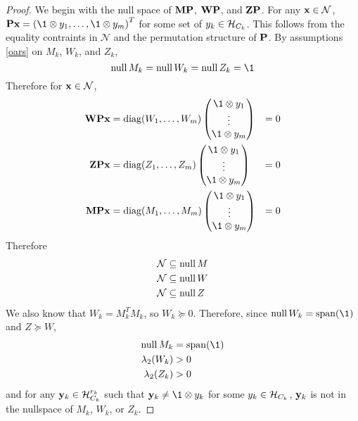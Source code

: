 \begin{proof}
We begin with the null space of $\mathbf{M}\mathbf{P}$, $\mathbf{W}\mathbf{P}$, and $\mathbf{Z}\mathbf{P}$.
For any $\mathbf{x} \in \mathcal{N}$, $\v{P}\v{x} = \left(\1 \otimes y_1, \dots, \1 \otimes y_m\right)^T$ for some set of $y_k \in \mathcal{H}_{C_k}$. 
This follows from the equality contraints in $\mathcal{N}$ and the permutation structure of $\mathbf{P}$.
By assumptions \eqref{oars} on $M_k$, $W_k$, and $Z_k$, 
\[
\nullspace{M_k} = \nullspace{W_k} = \nullspace{Z_k} = \1
\]
Therefore for $\mathbf{x} \in \mathcal{N}$, 
\begin{align}
\v{W}\v{P}\v{x} &= \diag{\left(W_1, \dots, W_m\right)} \begin{pmatrix}
    \1 \otimes y_1 \\
    \vdots \\
    \1 \otimes y_m 
\end{pmatrix} &= 0 \\
\v{Z}\v{P}\v{x} &= \diag{\left(Z_1, \dots, Z_m\right)} \begin{pmatrix}
    \1 \otimes y_1 \\
    \vdots \\
    \1 \otimes y_m 
\end{pmatrix} &= 0 \\
\v{M}\v{P}\v{x} &= \diag{\left(M_1, \dots, M_m\right)} \begin{pmatrix}
    \1 \otimes y_1 \\
    \vdots \\
    \1 \otimes y_m 
\end{pmatrix} &= 0 
\end{align}
Therefore 
\begin{align}
    \mathcal{N} &\subseteq \operatorname{null}{M} \\
    \mathcal{N} &\subseteq \operatorname{null}{W} \\
    \mathcal{N} &\subseteq \operatorname{null}{Z} 
\end{align}
We also know that $W_k = M_k^T M_k$, so $W_k \succeq 0$. 
Therefore, since $\nullspace{W_k} = \text{span}(\1)$ and $Z \succeq W$,
\begin{align}
\nullspace{M_k} &= \text{span}(\1) \\
\lambda_2(W_k) &> 0 \\
\lambda_2(Z_k) &> 0
\end{align}
and for any $\mathbf{y}_k \in \mathcal{H}_{C_k}^{r_k}$ such that $\v{y}_k \neq \1 \otimes y_k$ for some $y_k \in \mathcal{H}_{C_k}$, $\mathbf{y}_k$ is not in the nullspace of $M_k$, $W_k$, or $Z_k$.


\end{proof}
